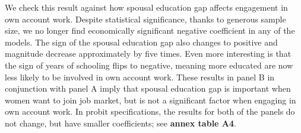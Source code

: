 We check this result against how spousal education gap affects engagement in own account work. Despite statistical significance, thanks to generous sample size, we no longer find economically significant negative coefficient in any of the models. The sign of the spousal education gap also changes to positive and magnitude decrease approximately by five times. Even more interesting is that the sign of years of schooling flips to negative, meaning more educated are now less likely to be involved in own account work. These results in panel B in conjunction with panel A imply that spousal education gap is important when women want to join job market, but is not a significant factor when engaging in own account work. In probit specifications, the results for both of the panels do not change, but have smaller coefficients; see \textbf{annex table A4}.\par


   
